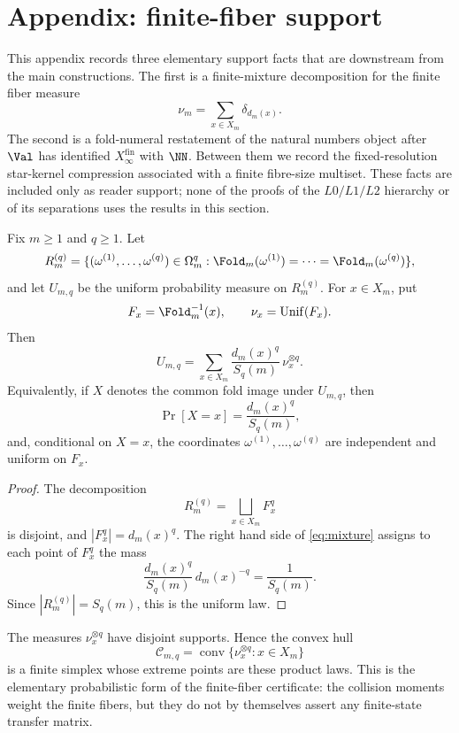 \section{Appendix: finite-fiber support}
\label{sec:consequences}

This appendix records three elementary support facts that are downstream
from the main constructions.  The first is a finite-mixture
decomposition for the finite fiber measure
\[
  \nu_m=\sum_{x\in X_m}\delta_{d_m(x)} .
\]
The second is a fold-numeral restatement of the natural numbers
object after \(\Val\) has identified
\(X_{\infty}^{\mathrm{fin}}\) with \(\NN\).  Between them we record the
fixed-resolution star-kernel compression associated with a finite fibre-size
multiset.  These facts are included only
as reader support; none of the proofs of the \(L0/L1/L2\) hierarchy or
of its separations uses the results in this section.

\begin{proposition}
\label{thm:mixture}
Fix \(m\ge1\) and \(q\ge1\).  Let
\[
  R_m^{(q)}=\{(\omega^{(1)},\ldots,\omega^{(q)})\in\Omega_m^q:
  \Fold_m(\omega^{(1)})=\cdots=\Fold_m(\omega^{(q)})\},
\]
and let \(U_{m,q}\) be the uniform probability measure on
\(R_m^{(q)}\).  For \(x\in X_m\), put
\[
  F_x=\Fold_m^{-1}(x),\qquad \nu_x=\mathrm{Unif}(F_x).
\]
Then
\begin{equation}\label{eq:mixture}
  U_{m,q}
  =\sum_{x\in X_m}\frac{d_m(x)^q}{S_q(m)}\,\nu_x^{\otimes q}.
\end{equation}
Equivalently, if \(X\) denotes the common fold image under
\(U_{m,q}\), then
\[
  \Pr[X=x]=\frac{d_m(x)^q}{S_q(m)},
\]
and, conditional on \(X=x\), the coordinates
\(\omega^{(1)},\ldots,\omega^{(q)}\) are independent and uniform on
\(F_x\).
\end{proposition}

\begin{proof}
The decomposition
\[
  R_m^{(q)}=\bigsqcup_{x\in X_m}F_x^q
\]
is disjoint, and \(|F_x^q|=d_m(x)^q\).  The right hand side of
\eqref{eq:mixture} assigns to each point of \(F_x^q\) the mass
\[
  \frac{d_m(x)^q}{S_q(m)}\,d_m(x)^{-q}=\frac1{S_q(m)}.
\]
Since \(|R_m^{(q)}|=S_q(m)\), this is the uniform law.
\end{proof}

The measures \(\nu_x^{\otimes q}\) have disjoint supports.  Hence the
convex hull
\[
  \mathcal C_{m,q}
  =\operatorname{conv}\{\nu_x^{\otimes q}:x\in X_m\}
\]
is a finite simplex whose extreme points are these product laws.  This
is the elementary probabilistic form of the finite-fiber certificate:
the collision moments weight the finite fibers, but they do not by
themselves assert any finite-state transfer matrix.

